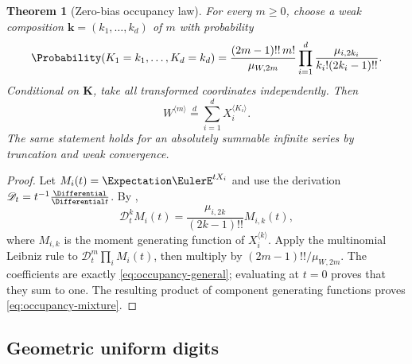\documentclass[11pt,oneside]{article}
\newtheorem{theorem}{Theorem}[section]
\theoremstyle{definition}
\theoremstyle{remark}
\newcommand{\Dop}{\mathscr D}
\begin{document}
\begin{theorem}[Zero-bias occupancy law]
\label{thm:occupancy-general}
For every $m\ge0$, choose a weak composition
$\bm k=(k_1,\ldots,k_d)$ of $m$ with probability
\begin{equation}
 \Probability(K_1=k_1,\ldots,K_d=k_d)
 =\frac{(2m-1)!!\,m!}{\mu_{W,2m}}
  \prod_{i=1}^{d}
  \frac{\mu_{i,2k_i}}{k_i!(2k_i-1)!!}.             \label{eq:occupancy-general}
\end{equation}
Conditional on $\bm K$, take all transformed coordinates independently.  Then
\begin{equation}
 W^{\langle m\rangle}
 \stackrel d=\sum_{i=1}^{d}X_i^{\langle K_i\rangle}.             \label{eq:occupancy-mixture}
\end{equation}
The same statement holds for an absolutely summable infinite series by
truncation and weak convergence.
\end{theorem}

\begin{proof}
Let $M_i(t)=\Expectation\EulerE^{tX_i}$ and use the derivation
$\Dop_t=t^{-1}\frac{\Differential}{\Differential t}$.  By
,
\begin{equation}
 \Dop_t^kM_i(t)
 =\frac{\mu_{i,2k}}{(2k-1)!!}
  M_{i,k}(t),                                       \label{eq:component-radial}
\end{equation}
where $M_{i,k}$ is the moment generating function of
$X_i^{\langle k\rangle}$.  Apply the multinomial Leibniz rule to
$\Dop_t^m\prod_iM_i(t)$, then multiply by
$(2m-1)!!/\mu_{W,2m}$.  The coefficients are exactly
\eqref{eq:occupancy-general}; evaluating at $t=0$ proves that they sum to one.
The resulting product of component generating functions proves
\eqref{eq:occupancy-mixture}.
\end{proof}

\subsection{Geometric uniform digits}
\end{document}
